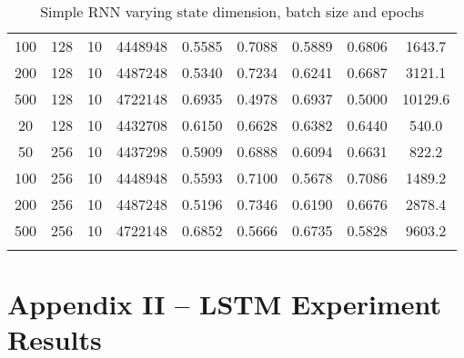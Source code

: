 \documentclass[letterpaper, 10pt]{article}
\begin{document}
\begin{longtable}{c | c | c | c | c | c | c | c | c}
100 & 128 & 10 & 4448948 & 0.5585 & 0.7088 & 0.5889 & 0.6806 & 1643.7 \\
200 & 128 & 10 & 4487248 & 0.5340 & 0.7234 & 0.6241 & 0.6687 & 3121.1 \\
500 & 128 & 10 & 4722148 & 0.6935 & 0.4978 & 0.6937 & 0.5000 & 10129.6 \\
20 & 128 & 10 & 4432708 & 0.6150 & 0.6628 & 0.6382 & 0.6440 & 540.0 \\
50 & 256 & 10 & 4437298 & 0.5909 & 0.6888 & 0.6094 & 0.6631 & 822.2 \\
100 & 256 & 10 & 4448948 & 0.5593 & 0.7100 & 0.5678 & 0.7086 & 1489.2 \\
200 & 256 & 10 & 4487248 & 0.5196 & 0.7346 & 0.6190 & 0.6676 & 2878.4 \\
500 & 256 & 10 & 4722148 & 0.6852 & 0.5666 & 0.6735 & 0.5828 & 9603.2 \\
\caption{Simple RNN varying state dimension, batch size and epochs}
\label{tab:fullresultsrnn1}
\end{longtable}

\newpage
\section{Appendix II -- LSTM Experiment Results}
\end{document}
